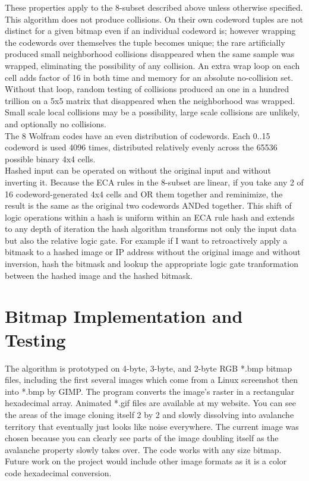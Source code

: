 \documentclass[11pt]{article}
\begin{document}
These properties apply to the 8-subset described above unless otherwise specified.\\

This algorithm does not produce collisions. On their own codeword tuples are not distinct for a given bitmap even if an individual codeword is; however wrapping the codewords over themselves the tuple becomes unique; the rare artificially produced small neighborhood collisions disappeared when the same sample was wrapped, eliminating the possibility of any collision. An extra wrap loop on each cell adds factor of 16 in both time and memory for an absolute no-collision set. Without that loop, random testing of collisions produced an one in a hundred trillion on a 5x5 matrix that disappeared when the neighborhood was wrapped. Small scale local collisions may be a possibility, large scale collisions are unlikely, and optionally no collisions.\\

The 8 Wolfram codes have an even distribution of codewords. Each 0..15 codeword is used 4096 times, distributed relatively evenly across the 65536 possible binary 4x4 cells.\\

Hashed input can be operated on without the original input and without inverting it. Because the ECA rules in the 8-subset are linear, if you take any 2 of 16 codeword-generated 4x4 cells and OR them together and reminimize, the result is the same as the original two codewords ANDed together.  This shift of logic operations within a hash is uniform within an ECA rule hash and extends to any depth of iteration the hash algorithm transforms not only the input data but also the relative logic gate. For example if I want to retroactively apply a bitmask to a hashed image or IP address without the original image and without inversion, hash the bitmask and lookup the appropriate logic gate tranformation between the hashed image and the hashed bitmask.\\

\section{Bitmap Implementation and Testing}

The algorithm is prototyped on 4-byte, 3-byte, and 2-byte RGB *.bmp bitmap files, including the first several images which come from a Linux screenshot then into *.bmp by GIMP. The program converts the image's raster in a rectangular hexadecimal array. Animated *.gif files are available at my website. You can see the areas of the image cloning itself 2 by 2 and slowly dissolving into avalanche territory that eventually just looks like noise everywhere. The current image was chosen because you can clearly see parts of the image doubling itself as the avalanche property slowly takes over. The code works with any size bitmap. Future work on the project would include other image formats as it is a color code hexadecimal conversion. \\
\end{document}
